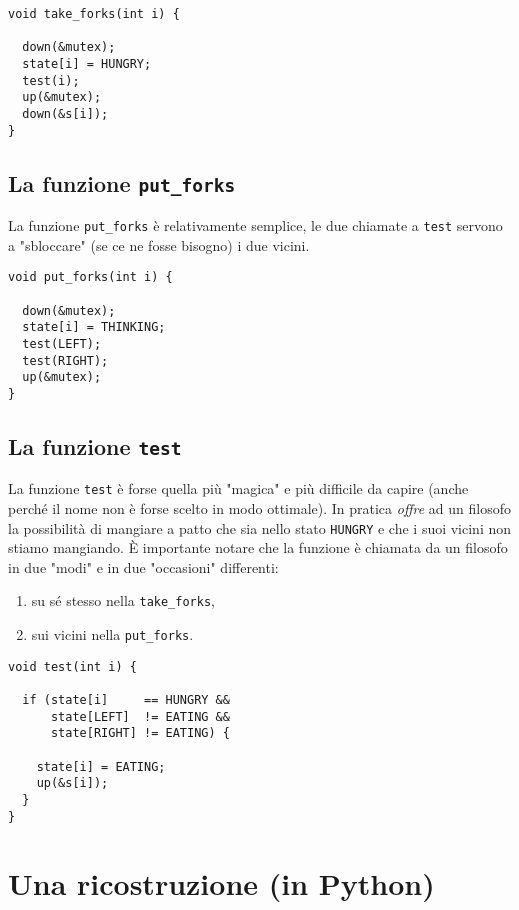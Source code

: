 \documentclass{article}
\begin{document}
\begin{verbatim}
void take_forks(int i) {

  down(&mutex);
  state[i] = HUNGRY;
  test(i);
  up(&mutex);
  down(&s[i]);
}
\end{verbatim}

\subsection{La funzione \texttt{put\_forks}}
\label{sec-3-4}

La funzione \texttt{put\_forks} è relativamente semplice, le due chiamate a
\texttt{test} servono a "sbloccare" (se ce ne fosse bisogno) i due vicini.

\begin{verbatim}
void put_forks(int i) {

  down(&mutex);
  state[i] = THINKING;
  test(LEFT);
  test(RIGHT);
  up(&mutex);
}
\end{verbatim}

\subsection{La funzione \texttt{test}}
\label{sec-3-5}

La funzione \texttt{test} è forse quella più "magica" e più difficile da
capire (anche perché il nome non è forse scelto in modo ottimale).
In pratica \emph{offre} ad un filosofo la possibilità di mangiare a
patto che sia nello stato \texttt{HUNGRY} e che i suoi vicini non stiamo
mangiando.  È importante notare che la funzione è chiamata da un
filosofo in due "modi" e in due "occasioni" differenti:

\begin{enumerate}
\item su sé stesso nella \texttt{take\_forks},
\item sui vicini nella \texttt{put\_forks}.
\end{enumerate}

\begin{verbatim}
void test(int i) {

  if (state[i]     == HUNGRY &&
      state[LEFT]  != EATING &&
      state[RIGHT] != EATING) {

    state[i] = EATING;
    up(&s[i]);    
  }
}
\end{verbatim}


\section{Una ricostruzione (in Python)}
\label{sec-4}
\end{document}
